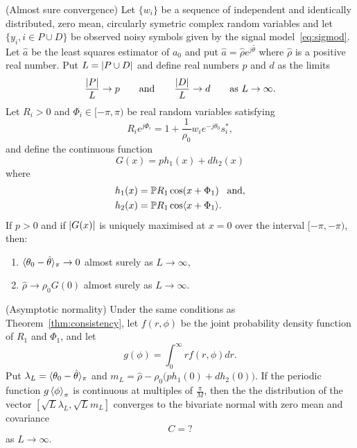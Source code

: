 \documentclass[journal]{IEEEtran}
\begin{document}
\begin{theorem}\label{thm:consistency} (Almost sure convergence)
Let $\{w_i\}$ be a sequence of independent and identically distributed, zero mean, circularly symetric complex random variables and let $\{y_i, i \in P \cup D\}$ be observed noisy symbols given by the signal model~\eqref{eq:sigmod}.   Let $\hat{a}$ be the least squares estimator of $a_0$ and put $\hat{a} = \hat{\rho}e^{j\hat{\theta}}$ where $\hat{\rho}$ is a positive real number.  Put $L = {\left| P \cup D \right|}$ and define real numbers $p$ and $d$ as the limits
\[
\frac{{\left| P \right|}}{L} \rightarrow p \qquad \text{and} \qquad \frac{{\left| D \right|}}{L} \rightarrow d \qquad \text{as $L \rightarrow \infty$.}
\] 
Let $R_i > 0$ and $\Phi_i \in [-\pi,\pi)$ be real random variables satisfying
\begin{equation}\label{eq:RiandPhii}
R_ie^{j\Phi_i} = 1 + \frac{1}{\rho_0} w_i e^{-j\theta_0} s_i^*,
\end{equation}
and define the continuous function
\[
G(x) = p h_1(x) + d h_2(x)
\]
where
\begin{align*}
h_1(x) &= {\mathbb P} R_1 \cos(x + \Phi_1) \;\;\; \text{and}, \\
h_2(x) &=  {\mathbb P} R_1 \cos\langle  x + \Phi_1 \rangle.
\end{align*}
If $p > 0$ and if ${\left| G(x) \right|}$ is uniquely maximised at $x = 0$ over the interval $[-\pi,-\pi)$, then:
\begin{enumerate}
\item $\langle \theta_0 - \hat{\theta} \rangle_\pi \rightarrow 0$ almost surely as $L \rightarrow \infty$,
\item $\hat{\rho} \rightarrow \rho_0 G(0)$ almost surely as $L \rightarrow \infty$.
\end{enumerate}
\end{theorem}

\begin{theorem}\label{thm:normality} (Asymptotic normality)
Under the same conditions as Theorem~\ref{thm:consistency}, let $f(r,\phi)$ be the joint probability density function of $R_1$ and $\Phi_1$, and let
\[
g(\phi) = \int_{0}^{\infty} r f(r,\phi) dr.
\]
Put $\lambda_L = \langle \theta_0 - \hat{\theta} \rangle_\pi$ and $m_L = \hat{\rho} - \rho_0\big(p h_1(0) + d h_2(0) \big)$. If the periodic function $g\left\langle \phi \right\rangle_{\pi}$ is continuous at multiples of $\tfrac{\pi}{M}$, then the the distribution of the vector $[\sqrt{L}\lambda_L, \sqrt{L}m_L]$ converges to the bivariate normal with zero mean and covariance
\[
C = ?
\]
as $L \rightarrow \infty$.
\end{theorem}
\end{document}
